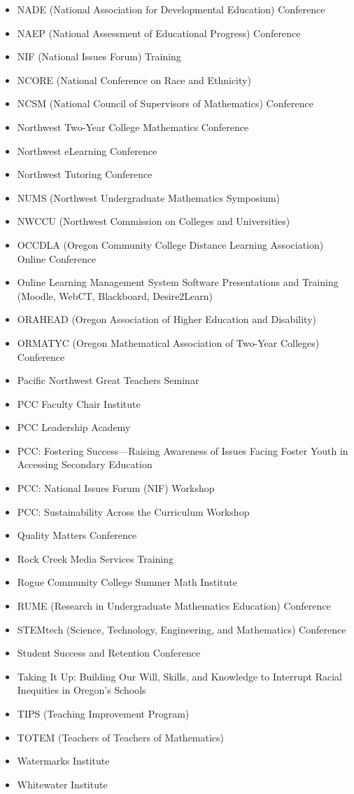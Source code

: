 \begin{itemize}[label={}]
\item NADE (National Association for Developmental Education) Conference
\item NAEP (National Assessment of Educational Progress) Conference
\item NIF (National Issues Forum) Training
\item NCORE (National Conference on Race and Ethnicity)
\item NCSM (National Council of Supervisors of Mathematics) Conference
\item Northwest Two-Year College Mathematics Conference
\item Northwest eLearning Conference
\item Northwest Tutoring Conference
\item NUMS (Northwest Undergraduate Mathematics Symposium)
\item NWCCU (Northwest Commission on Colleges and Universities)
\item OCCDLA (Oregon Community College Distance Learning Association) Online Conference
\item Online Learning Management System Software Presentations and Training (Moodle, WebCT, Blackboard, Desire2Learn)
\item ORAHEAD (Oregon Association of Higher Education and Disability)
\item ORMATYC (Oregon Mathematical Association of Two-Year Colleges) Conference
\item Pacific Northwest Great Teachers Seminar
\item PCC Faculty Chair Institute
\item PCC Leadership Academy
\item PCC: Fostering Success---Raising Awareness of Issues Facing Foster Youth in Accessing Secondary Education
\item PCC: National Issues Forum (NIF) Workshop
\item PCC: Sustainability Across the Curriculum Workshop %
\item Quality Matters Conference
\item Rock Creek Media Services Training
\item Rogue Community College Summer Math Institute
\item RUME (Research in Undergraduate Mathematics Education) Conference
\item STEMtech (Science, Technology, Engineering, and Mathematics) Conference
\item Student Success and Retention Conference
\item Taking It Up:  Building Our Will, Skills, and Knowledge to Interrupt Racial Inequities in Oregon's Schools
\item TIPS (Teaching Improvement Program)
\item TOTEM (Teachers of Teachers of Mathematics)
\item Watermarks Institute
\item Whitewater Institute
\end{itemize}

